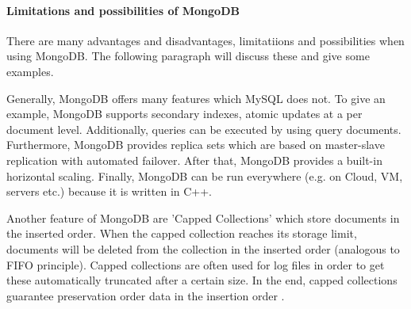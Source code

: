 \paragraph{Limitations and possibilities of MongoDB}

There are many advantages and disadvantages, limitatiions and possibilities when using MongoDB. The following paragraph will discuss these and give some examples.

Generally, MongoDB offers many features which MySQL does not. To give an example, MongoDB supports secondary indexes, atomic updates at a per document level. Additionally, queries can be executed by using query documents. Furthermore, MongoDB provides replica sets which are based on master-slave replication with automated failover. After that, MongoDB provides a built-in horizontal scaling. Finally, MongoDB can be run everywhere (e.g. on Cloud, \ac{VM}, servers etc.) because it is written in C++. 

Another feature of MongoDB are 'Capped Collections' which store documents in the inserted order. When the capped collection reaches its storage limit, documents will be deleted from the collection in the inserted order (analogous to \ac{FIFO} principle). Capped collections are often used for log files in order to get these automatically truncated after a certain size. In the end, capped collections guarantee preservation order data in the insertion order \cite[p.31 ff.]{mongodb_edward}.

